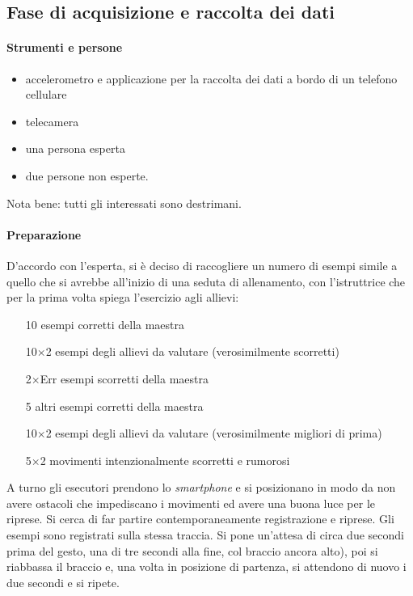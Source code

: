 \subsection{Fase di acquisizione e raccolta dei dati}

\paragraph{Strumenti e persone} 

\begin{itemize}
  \item accelerometro e applicazione per la raccolta dei dati a bordo di un telefono cellulare
  \item telecamera
  \item una persona esperta
  \item due persone non esperte.
\end{itemize}
Nota bene: tutti gli interessati sono destrimani.

\paragraph{Preparazione}
D'accordo con l'esperta,
si è deciso di raccogliere un numero di esempi
simile a quello che si avrebbe all'inizio di una seduta di allenamento,
con l'istruttrice che per la prima volta spiega l'esercizio agli allievi:
\begin{itemize}
	\item[10] esempi corretti della maestra
    \item[10$\times$2] esempi degli allievi da valutare (verosimilmente scorretti) 
    \item[2$\times$Err] esempi scorretti della maestra
    \item[5] altri esempi corretti della maestra
    \item[10$\times$2] esempi degli allievi da valutare (verosimilmente migliori di prima)
    \item[5$\times$2] movimenti intenzionalmente scorretti e rumorosi
\end{itemize}
A turno gli esecutori prendono lo \textit{smartphone} e
si posizionano in modo da non avere ostacoli che impediscano i movimenti
ed avere una buona luce per le riprese.
Si cerca di far partire contemporaneamente registrazione e riprese.
Gli esempi sono registrati sulla stessa traccia.
Si pone un'attesa di circa due secondi prima del gesto,
una di tre secondi alla fine, col braccio ancora alto),
poi si riabbassa il braccio e,
una volta in posizione di partenza,
si attendono di nuovo i due secondi e si ripete.



